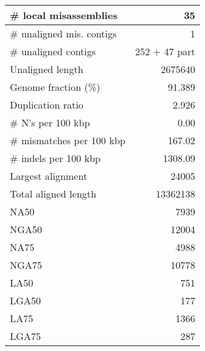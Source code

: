 \documentclass[12pt,a4paper]{article}
\begin{document}
\begin{table}[ht]
\begin{center}
\begin{tabular}{|l*{1}{|r}|}
\# local misassemblies & 35 \\ \hline
\# unaligned mis. contigs & 1 \\ \hline
\# unaligned contigs & 252 + 47 part \\ \hline
Unaligned length & 2675640 \\ \hline
Genome fraction (\%) & 91.389 \\ \hline
Duplication ratio & 2.926 \\ \hline
\# N's per 100 kbp & 0.00 \\ \hline
\# mismatches per 100 kbp & 167.02 \\ \hline
\# indels per 100 kbp & 1308.09 \\ \hline
Largest alignment & 24005 \\ \hline
Total aligned length & 13362138 \\ \hline
NA50 & 7939 \\ \hline
NGA50 & 12004 \\ \hline
NA75 & 4988 \\ \hline
NGA75 & 10778 \\ \hline
LA50 & 751 \\ \hline
LGA50 & 177 \\ \hline
LA75 & 1366 \\ \hline
LGA75 & 287 \\ \hline
\end{tabular}
\end{center}
\end{table}
\end{document}
